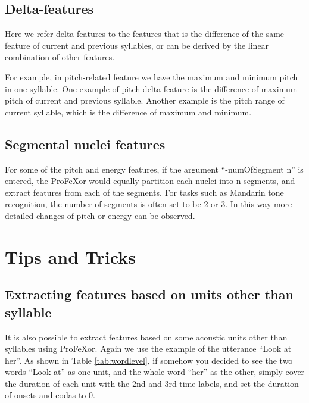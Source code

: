 \documentclass[12pt]{article}
\begin{document}
\subsection{Delta-features}

Here we refer delta-features to the features that is the difference of the same feature of current and previous syllables, or can be derived by the linear combination of other features.

For example, in pitch-related feature we have the maximum and minimum pitch in one syllable. One example of pitch delta-feature is the difference of maximum pitch of current and previous syllable. Another example is the pitch range of current syllable, which is the difference of maximum and minimum.

\subsection{Segmental nuclei features}
\label{sec:segment}

For some of the pitch and energy features, if the argument ``-numOfSegment n'' is entered, the ProFeXor would equally partition each nuclei into n segments, and extract features from each of the segments. For tasks such as Mandarin tone recognition, the number of segments is often set to be 2 or 3. In this way more detailed changes of pitch or energy can be observed.

\section{Tips and Tricks}
\label{sec:trick}

\subsection{Extracting features based on units other than syllable}

It is also possible to extract features based on some acoustic units other than syllables using ProFeXor. Again we use the example of the utterance ``Look at her''. As shown in Table \ref{tab:wordlevel}, if somehow you decided to see the two words ``Look at'' as one unit, and the whole word ``her'' as the other, simply cover the duration of each unit with the 2nd and 3rd time labels, and set the duration of onsets and codas to 0.
\end{document}
